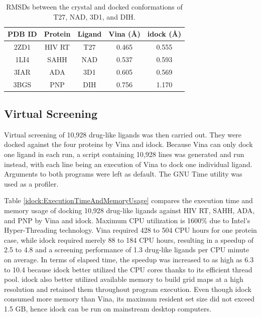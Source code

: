 \begin{table}
\centering
\begin{tabular*}
{\linewidth}
{@{\extracolsep{\fill}}ccccc}
\toprule
PDB ID & Protein & Ligand & Vina (\AA) & idock (\AA)\\
\midrule
2ZD1 & HIV RT & T27 & 0.465 & 0.555\\
1LI4 & SAHH   & NAD & 0.537 & 0.593\\
3IAR & ADA    & 3D1 & 0.605 & 0.569\\
3BGS & PNP    & DIH & 0.756 & 1.170\\
\bottomrule
\end{tabular*}
\caption{RMSDs between the crystal and docked conformations of T27, NAD, 3D1, and DIH.}
\label{idock:RMSD}
\end{table}

\subsection{Virtual Screening}

Virtual screening of 10,928 drug-like ligands was then carried out. They were docked against the four proteins by Vina and idock. Because Vina can only dock one ligand in each run, a script containing 10,928 lines was generated and run instead, with each line being an execution of Vina to dock one individual ligand. Arguments to both programs were left as default. The GNU Time utility was used as a profiler.

Table \ref{idock:ExecutionTimeAndMemoryUsage} compares the execution time and memory usage of docking 10,928 drug-like ligands against HIV RT, SAHH, ADA, and PNP by Vina and idock. Maximum CPU utilization is 1600\% due to Intel's Hyper-Threading technology. Vina required 428 to 504 CPU hours for one protein case, while idock required merely 88 to 184 CPU hours, resulting in a speedup of 2.5 to 4.8 and a screening performance of 1.3 drug-like ligands per CPU minute on average. In terms of elapsed time, the speedup was increased to as high as 6.3 to 10.4 because idock better utilized the CPU cores thanks to its efficient thread pool. idock also better utilized available memory to build grid maps at a high resolution and retained them throughout program execution. Even though idock consumed more memory than Vina, its maximum resident set size did not exceed 1.5 GB, hence idock can be run on mainstream desktop computers.

